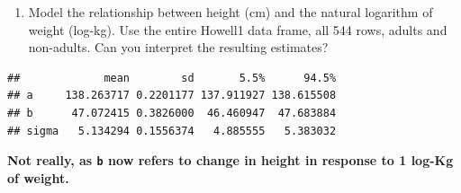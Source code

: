 \documentclass[
]{book}
\newenvironment{Shaded}{\begin{snugshade}}{\end{snugshade}}
\newcommand{\AttributeTok}[1]{\textcolor[rgb]{0.77,0.63,0.00}{#1}}
\newcommand{\CommentTok}[1]{\textcolor[rgb]{0.56,0.35,0.01}{\textit{#1}}}
\newcommand{\DecValTok}[1]{\textcolor[rgb]{0.00,0.00,0.81}{#1}}
\newcommand{\FunctionTok}[1]{\textcolor[rgb]{0.00,0.00,0.00}{#1}}
\newcommand{\NormalTok}[1]{#1}
\newcommand{\OtherTok}[1]{\textcolor[rgb]{0.56,0.35,0.01}{#1}}
\newcommand{\SpecialCharTok}[1]{\textcolor[rgb]{0.00,0.00,0.00}{#1}}
\providecommand{\tightlist}{%
  \setlength{\itemsep}{0pt}\setlength{\parskip}{0pt}}
\begin{document}
\begin{enumerate}
\def\labelenumi{(\alph{enumi})}
\tightlist
\item
  Model the relationship between height (cm) and the natural logarithm of weight (log-kg). Use the entire Howell1 data frame, all 544 rows, adults and non-adults. Can you interpret the resulting estimates?
\end{enumerate}

\begin{Shaded}
\end{Shaded}

\begin{verbatim}
##             mean        sd       5.5%      94.5%
## a     138.263717 0.2201177 137.911927 138.615508
## b      47.072415 0.3826000  46.460947  47.683884
## sigma   5.134294 0.1556374   4.885555   5.383032
\end{verbatim}

\textbf{Not really, as \texttt{b} now refers to change in height in response to 1 log-Kg of weight.}
\end{document}
